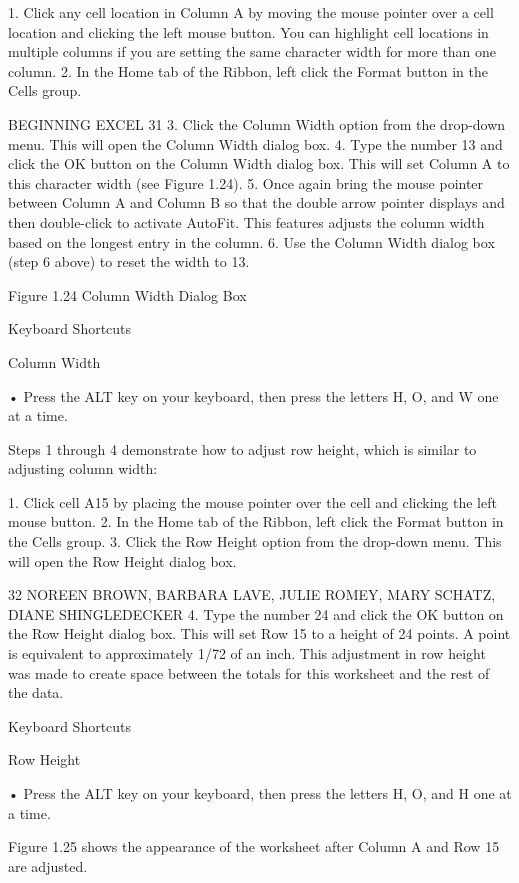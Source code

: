 1. Click any cell location in Column A by moving the mouse pointer over a cell location and
clicking the left mouse button. You can highlight cell locations in multiple columns if you are
setting the same character width for more than one column.
2. In the Home tab of the Ribbon, left click the Format button in the Cells group.

BEGINNING EXCEL 31
3. Click the Column Width option from the drop-down menu. This will open the Column Width
dialog box.
4. Type the number 13 and click the OK button on the Column Width dialog box. This will set
Column A to this character width (see Figure 1.24).
5. Once again bring the mouse pointer between Column A and Column B so that the double arrow
pointer displays and then double-click to activate AutoFit. This features adjusts the column
width based on the longest entry in the column.
6. Use the Column Width dialog box (step 6 above) to reset the width to 13.




Figure 1.24 Column Width Dialog Box




Keyboard Shortcuts


Column Width

• Press the ALT key on your keyboard, then press the letters H, O, and W one at a time.



Steps 1 through 4 demonstrate how to adjust row height, which is similar to adjusting column width:

1. Click cell A15 by placing the mouse pointer over the cell and clicking the left mouse button.
2. In the Home tab of the Ribbon, left click the Format button in the Cells group.
3. Click the Row Height option from the drop-down menu. This will open the Row Height dialog
box.

32 NOREEN BROWN, BARBARA LAVE, JULIE ROMEY, MARY SCHATZ, DIANE SHINGLEDECKER
4. Type the number 24 and click the OK button on the Row Height dialog box. This will set Row
15 to a height of 24 points. A point is equivalent to approximately 1/72 of an inch. This
adjustment in row height was made to create space between the totals for this worksheet and the
rest of the data.


Keyboard Shortcuts


Row Height

• Press the ALT key on your keyboard, then press the letters H, O, and H one at a time.



Figure 1.25 shows the appearance of the worksheet after Column A and Row 15 are adjusted.




